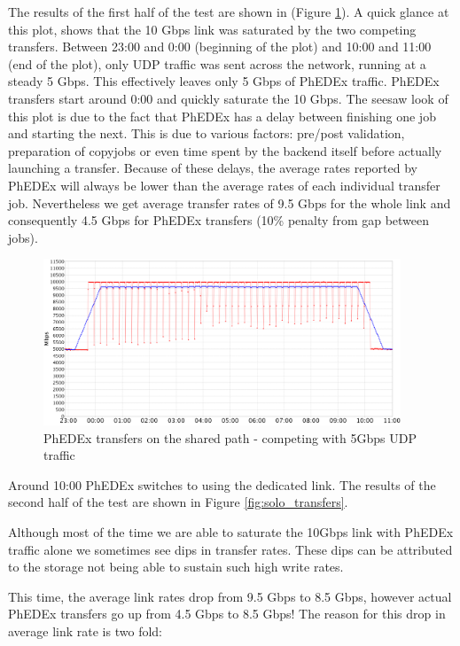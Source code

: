 The results of the first half of the test are shown in  (Figure \ref{fig:shared_transfers}).
A quick glance at this plot, shows that the 10 Gbps link was saturated by the two
competing transfers. Between 23:00 and 0:00 (beginning of the plot) and 
10:00 and 11:00 (end of the plot), only UDP traffic was sent across the network, 
running at a steady 5 Gbps. This effectively leaves only 5 Gbps of PhEDEx traffic.
PhEDEx transfers start around 0:00 and quickly saturate the 10 Gbps. 
The seesaw look of this plot is due to the fact that PhEDEx has a delay
between finishing one job and starting the next. This is due to various factors:
 pre/post validation, preparation of copyjobs or even time spent by the backend itself 
 before actually launching a transfer. Because of these delays, the average 
 rates reported by PhEDEx will always be lower than the average rates of each
 individual transfer job. Nevertheless we get average transfer rates of 9.5 Gbps for the
 whole link and consequently 4.5 Gbps for PhEDEx transfers (10\% penalty from
 gap between jobs).

\begin{figure}[h]
  \centering
  \includegraphics[width=0.95\textwidth]{Figures/FileDownload_Shared_path.png}
  \caption{PhEDEx transfers on the shared path - competing with 5Gbps UDP traffic}
  \label{fig:shared_transfers}
\end{figure} 

Around 10:00 PhEDEx switches to using the dedicated link. The results of the 
second half of the test are shown in Figure \ref{fig:solo_transfers}.

Although most of the time we are able to saturate the 10Gbps link with PhEDEx 
traffic alone we sometimes see dips in transfer rates. These dips can be attributed 
to the storage not being able to sustain such high write rates.

This time, the average link rates drop from 9.5 Gbps to 8.5 Gbps, however 
actual PhEDEx transfers go up from 4.5 Gbps to 8.5 Gbps! The reason for this 
drop in average link rate is two fold: 

